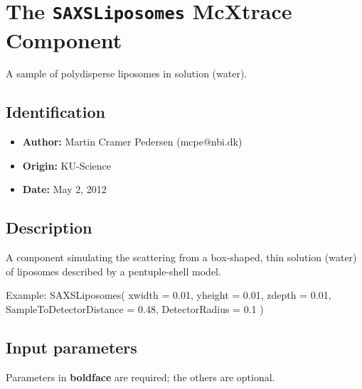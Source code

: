 \section{The \texttt{SAXSLiposomes} McXtrace Component}
A sample of polydisperse liposomes in solution (water).

\subsection*{Identification}
\begin{itemize}
  \item \textbf{Author:} Martin Cramer Pedersen (mcpe@nbi.dk)
  \item \textbf{Origin:} KU-Science
  \item \textbf{Date:} May 2, 2012
\end{itemize}

\subsection*{Description}
A component simulating the scattering from a box-shaped, thin solution (water) of liposomes described by a pentuple-shell model.

Example: SAXSLiposomes( xwidth = 0.01, yheight = 0.01, zdepth = 0.01, SampleToDetectorDistance = 0.48, DetectorRadius = 0.1 )

\subsection*{Input parameters}
Parameters in \textbf{boldface} are required; the others are optional.

